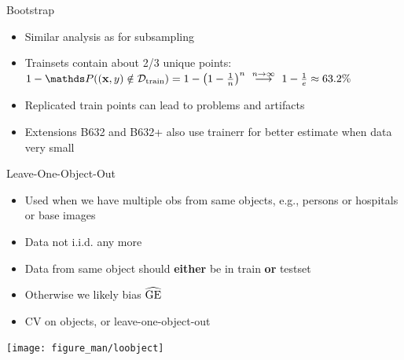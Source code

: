 \documentclass[11pt,compress,t,notes=noshow, xcolor=table]{beamer}
\begin{document}
\begin{vbframe}{Bootstrap}

\begin{itemize}
  \item Similar analysis as for subsampling
  \item Trainsets contain about 2/3 unique points:
      $1 - \P((\xv, y) \notin \Dtrain) = 1 - \left(1 - \frac{1}{n}\right)^n 
  \ \stackrel{n \to \infty}{\longrightarrow} \ 1-\frac{1}{e} \approx 63.2 \%$ 
\item Replicated train points can lead to problems and artifacts
\item Extensions B632 and B632+ also use trainerr for better estimate when data very small

\end{itemize}

\end{vbframe}


\begin{vbframe}{Leave-One-Object-Out}

\begin{itemize}
    \item Used when we have multiple obs from same objects, e.g., persons 
        or hospitals or base images
    \item Data not i.i.d. any more
    \item Data from same object should \textbf{either} be in train \textbf{or}
        testset
    \item Otherwise we likely bias $\widehat{\mathrm{GE}}$
    \item CV on objects, or leave-one-object-out
\lz
\end{itemize}

\begin{knitrout}\scriptsize
{}\color{fgcolor}

{\centering \texttt{[image: figure\_man/loobject]} 

}

\end{knitrout}
\end{vbframe}
\endlecture
\end{document}
